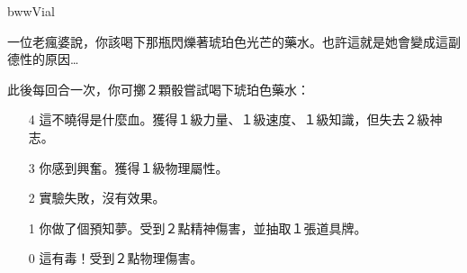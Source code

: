 \begin{OmenCard}{bww}{Vial}{}
  \begin{CardStory}
    一位老瘋婆說，你該喝下那瓶閃爍著琥珀色光芒的藥水。也許這就是她會變成這副德性的原因…
  \end{CardStory}
  此後每回合一次，你可擲２顆骰嘗試喝下琥珀色藥水：
  \begin{itemize}
    \item[4] 這不曉得是什麼血。獲得１級力量、１級速度、１級知識，但失去２級神志。
    \item[3] 你感到興奮。獲得１級物理屬性。
    \item[2] 實驗失敗，沒有效果。
    \item[1] 你做了個預知夢。受到２點精神傷害，並抽取１張道具牌。
    \item[0] 這有毒！受到２點物理傷害。
  \end{itemize}
\end{OmenCard}%
\linebreak[0]%
